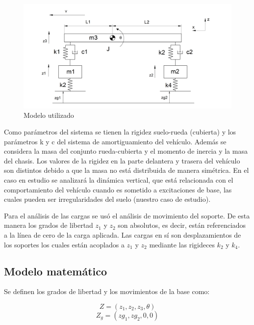 \documentclass[oneside, a4paper, spanish, links]{amca}
\begin{document}
\begin{figure}[ht] %
    \centering
    \includegraphics[width=1
    \textwidth]{modelo.png}
    \caption{Modelo utilizado}
    \label{fig: modelo} %
\end{figure}

Como parámetros del sistema se tienen la rigidez suelo-rueda (cubierta) y los parámetros k y c del sistema de amortiguamiento del vehículo. Además se considera la masa del conjunto rueda-cubierta y el momento de inercia y la masa del chasis. Los valores de la rigidez en la parte delantera y trasera del vehículo son distintos debido a que la masa no está distribuida de manera simétrica.
En el caso en estudio se analizará la dinámica vertical, que está relacionada con el comportamiento del vehículo cuando es sometido a excitaciones de base, las cuales pueden ser irregularidades del suelo (nuestro caso de estudio). 

Para el análisis de las cargas se usó el análisis de movimiento del soporte. De esta manera los grados de libertad $z_1$ y $z_2$ son absolutos, es decir, están referenciados a la línea de cero de la carga aplicada. Las cargas en sí son desplazamientos de los soportes los cuales están acoplados a $z_1$ y $z_2$ mediante las rigideces \textit{$k_2$} y \textit{$k_4$}.

\subsection{Modelo matemático}

Se definen los grados de libertad y los movimientos de la base como:

\begin{equation}
    Z=(z_1, z_2, z_3, \theta)
\end{equation}
\begin{equation}
    Z_g=(zg_1, zg_2, 0, 0)
\end{equation}
\end{document}
